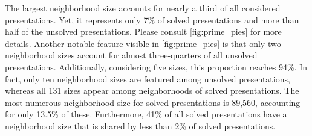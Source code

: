 The largest neighborhood size accounts for nearly a third of all considered presentations.
Yet, it represents only 7\% of solved presentations and more than half of the unsolved presentations.
Please consult \cref{fig:prime_pies} for more details.
Another notable feature visible in \cref{fig:prime_pies} is that only two neighborhood sizes account for almost three-quarters of all unsolved presentations.
Additionally, considering five sizes, this proportion reaches 94\%.
In fact, only ten neighborhood sizes are featured among unsolved presentations, whereas all 131 sizes appear among neighborhoods of solved presentations.
The most numerous neighborhood size for solved presentations is 89,560, accounting for only 13.5\% of these.
Furthermore, 41\% of all solved presentations have a neighborhood size that is shared by less than 2\% of solved presentations.


